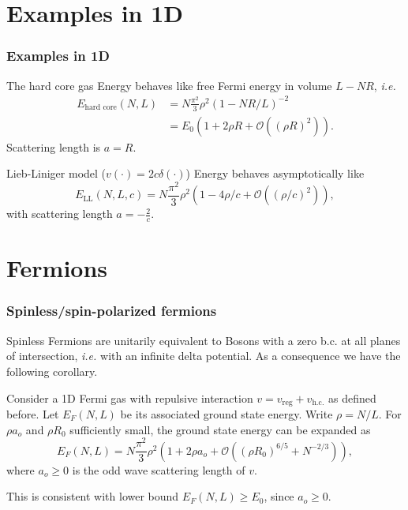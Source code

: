 \documentclass{beamer}[10]
\newcommand{\ie}{\emph{i.e.} }
\begin{document}
\section{Examples in 1D}
\begin{frame}
	\frametitle{Examples in 1D}
	\begin{block}{The hard core gas}
		Energy behaves like free Fermi energy in volume $ L-NR $, \ie \begin{equation}
		\begin{aligned}
		E_{\text{hard core}}(N,L)&=N\frac{\pi^2}{3}\rho^2 (1-NR/L)^{-2}\\&= E_0\left(1+2\rho R+\mathcal{O}\left((\rho R)^2\right)\right).
		\end{aligned}
		\end{equation}
		Scattering length is $ a=R $.
	\end{block}
	\begin{block}{Lieb-Liniger model ($v(\cdot)=2c\delta(\cdot)$)}
		Energy behaves asymptotically like
		\begin{equation}
		E_{\text{LL}}(N,L,c)=N\frac{\pi^2}{3}\rho^2\left(1-4\rho/c+\mathcal{O}\left((\rho/c)^2\right)\right),
		\end{equation}
		with scattering length $ a=-\frac{2}{c} $.
	\end{block}
\end{frame}



\section{Fermions}
\begin{frame}
	\frametitle{Spinless/spin-polarized fermions}
	Spinless Fermions are unitarily equivalent to Bosons with a zero b.c. at all planes of intersection, \ie with an infinite delta potential. As a consequence we have the following corollary. 
	\begin{theorem}\label{TheoremFermion}
		Consider a 1D Fermi gas with repulsive interaction  $v=v_{\text{reg}}+v_{\text{h.c.}}$ as defined before. Let $ E_F(N,L)$ be its associated ground state energy. Write $\rho=N/L$. For $\rho a_o$ and $\rho R_0$ sufficiently small, the ground state energy can be expanded as 
		\begin{equation}
		E_F(N,L)=N\frac{\pi^2}{3}\rho^2\left(1+2\rho a_o+\mathcal{O}\left(\left(\rho R_0\right)^{6/5}+N^{-2/3}\right)\right),
		\end{equation}
		where $ a_o\geq0 $ is the odd wave scattering length of $v$. 
	\end{theorem} 
	This is consistent with lower bound $ E_F(N,L)\geq E_0 $, since $ a_o\geq 0 $.
\end{frame}
\end{document}
